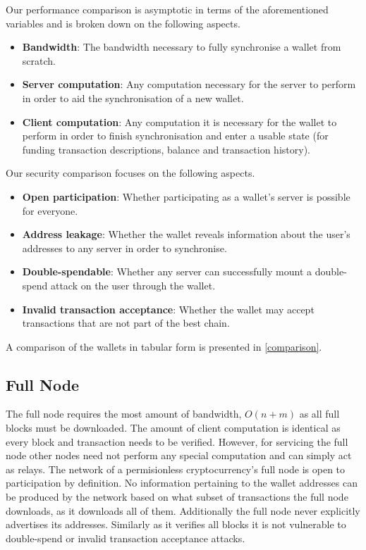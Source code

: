 \documentclass[sigconf,authordraft]{acmart}
\begin{document}
Our performance comparison is asymptotic in terms of the aforementioned variables and is broken down on the following aspects.

\begin{itemize}
    \item \textbf{Bandwidth}: The bandwidth necessary to fully synchronise a wallet from scratch.
    \item \textbf{Server computation}: Any computation necessary for the server to perform in order to aid the synchronisation of a new wallet.
    \item \textbf{Client computation}: Any computation it is necessary for the wallet to perform in order to finish synchronisation and enter a usable state (for funding transaction descriptions, balance and transaction history).
\end{itemize}

Our security comparison focuses on the following aspects.
\begin{itemize}
    \item \textbf{Open participation}: Whether participating as a wallet's server is possible for everyone.
    \item \textbf{Address leakage}: Whether the wallet reveals information about the user's addresses to any server in order to synchronise.
    \item \textbf{Double-spendable}: Whether any server can successfully mount a double-spend attack on the user through the wallet.
    \item \textbf{Invalid transaction acceptance}: Whether the wallet may accept transactions that are not part of the best chain.
\end{itemize}

A comparison of the wallets in tabular form is presented in \cref{comparison}.

\subsection{Full Node}
The full node requires the most amount of bandwidth, $O(n+m)$ as all full blocks must be downloaded. The amount of client computation is identical as every block and transaction needs to be verified. However, for servicing the full node other nodes need not perform any special computation and can simply act as relays. The network of a permisionless cryptocurrency's full node is open to participation by definition. No information pertaining to the wallet addresses can be produced by the network based on what subset of transactions the full node downloads, as it downloads all of them. Additionally the full node never explicitly advertises its addresses. Similarly as it verifies all blocks it is not vulnerable to double-spend or invalid transaction acceptance attacks.
\end{document}
